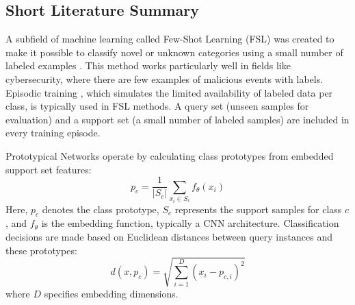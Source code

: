 \subsection{Short Literature Summary}
\label{subsec:literature}

A subfield of machine learning called Few-Shot Learning (FSL) was created to make it possible to classify novel or unknown categories using a small number of labeled examples \cite{snell2017prototypical}. This method works particularly well in fields like cybersecurity, where there are few examples of malicious events with labels. Episodic training \cite{sicara2023easyfsl}, which simulates the limited availability of labeled data per class, is typically used in FSL methods. A query set (unseen samples for evaluation) and a support set (a small number of labeled samples) are included in every training episode.

Prototypical Networks \cite{snell2017prototypical} operate by calculating class prototypes from embedded support set features:
\begin{equation}
p_c = \frac{1}{|S_c|} \sum_{x_i \in S_c} f_\theta(x_i)
\end{equation}
Here, $p_c$ denotes the class prototype, $S_c$ represents the support samples for class $c$, and $f_\theta$ is the embedding function, typically a CNN architecture. Classification decisions are made based on Euclidean distances between query instances and these prototypes:
\begin{equation}
d(x, p_c) = \sqrt{\sum_{i=1}^{D}(x_i - p_{c,i})^2}
\end{equation}
where $D$ specifies embedding dimensions.